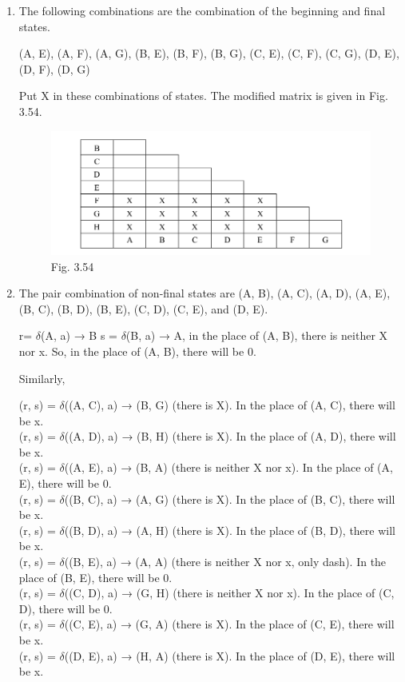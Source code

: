 \documentclass[11pt,apacite]{article}
\begin{document}
\begin{enumerate}
	\item The following combinations are the combination of the beginning and final states.
	\begin{center}
	(A, E), (A, F), (A, G), (B, E), (B, F), (B, G), (C, E), (C, F), (C, G), (D, E), (D, F), (D, G) 
	\end{center}
	Put X in these combinations of states. The modified matrix is given in Fig. 3.54.
	\begin{figure}[H]
		\begin{center}
			\begin{center}
				\includegraphics[scale=.45]{Fig354.png}
			\end{center}
			\caption{Fig. 3.54}
		\end{center}
	\end{figure}

		\item The pair combination of non-final states are (A, B), (A, C), (A, D), (A, E), (B, C), (B, D), (B, E), (C, D), (C, E), and (D, E).
		
		r= $\delta$(A, a) → B s = $\delta$(B, a) → A, in the place of (A, B), there is neither X nor x. So, in the place
		of (A, B), there will be 0.
		 
		 Similarly,
		 
		 (r, s) = $\delta$((A, C), a) → (B, G) (there is X). In the place of (A, C), there will be x.\\
		 (r, s) = $\delta$((A, D), a) → (B, H) (there is X). In the place of (A, D), there will be x.\\
		 (r, s) = $\delta$((A, E), a) → (B, A) (there is neither X nor x). In the place of (A, E), there will
		 be 0.\\
		 (r, s) = $\delta$((B, C), a) → (A, G) (there is X). In the place of (B, C), there will be x.\\
		 (r, s) = $\delta$((B, D), a) → (A, H) (there is X). In the place of (B, D), there will be x.\\
		 (r, s) = $\delta$((B, E), a) → (A, A) (there is neither X nor x, only dash). In the place of (B, E),
		 there will be 0.\\
		 (r, s) = $\delta$((C, D), a) → (G, H) (there is neither X nor x). In the place of (C, D), there will
		 be 0.\\
		 (r, s) = $\delta$((C, E), a) → (G, A) (there is X). In the place of (C, E), there will be x.\\
		 (r, s) = $\delta$((D, E), a) → (H, A) (there is X). In the place of (D, E), there will be x.\\
		 

\end{enumerate}
\end{document}
